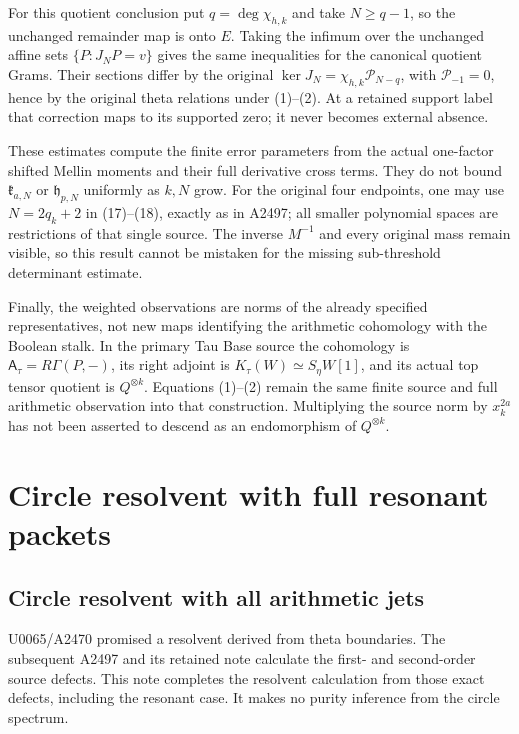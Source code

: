 \documentclass[10pt,a4paper,oneside]{report}
\begin{document}
For this quotient conclusion put \(q=\deg\chi_{h,k}\) and take
\(N\ge q-1\), so the unchanged remainder map is onto \(E\).
Taking the infimum over the unchanged affine sets
\(\{P:J_NP=v\}\) gives the same inequalities for the canonical
quotient Grams. Their sections differ by the original
\(\ker J_N=\chi_{h,k}\mathcal P_{N-q}\), with
\(\mathcal P_{-1}=0\), hence by the original theta
relations under (1)--(2). At a retained support label that correction
maps to its supported zero; it never becomes external absence.

These estimates compute the finite error parameters from the actual
one-factor shifted Mellin moments and their full derivative cross
terms. They do not bound \(\mathfrak k_{a,N}\) or
\(\mathfrak h_{p,N}\) uniformly as \(k,N\) grow. For the original
four endpoints, one may use \(N=2q_k+2\) in (17)--(18), exactly as
in A2497; all smaller polynomial spaces are restrictions of that
single source. The inverse \(M^{-1}\) and every original mass remain
visible, so this result cannot be mistaken for the missing
sub-threshold determinant estimate.

Finally, the weighted observations are norms of the already specified
representatives, not new maps identifying the arithmetic cohomology
with the Boolean stalk. In the primary Tau Base source the cohomology
is \(\mathsf A_\tau=R\Gamma(P,-)\), its right adjoint is
\(K_\tau(W)\simeq S_\eta W[1]\), and its actual top tensor quotient
is \(Q^{\otimes k}\). Equations (1)--(2) remain the same finite source
and full arithmetic observation into that construction. Multiplying
the source norm by \(x_k^{2a}\) has not been asserted to descend as
an endomorphism of \(Q^{\otimes k}\).
\endgroup


\endgroup
\clearpage
\chapter{Circle resolvent with full resonant packets}
\begingroup
\begingroup

\section{Circle resolvent with all arithmetic jets}
U0065/A2470 promised a resolvent derived from theta boundaries. The
subsequent A2497 and its retained note calculate the first- and
second-order source defects. This note completes the resolvent
calculation from those exact defects, including the resonant case.
It makes no purity inference from the circle spectrum.
\end{document}
